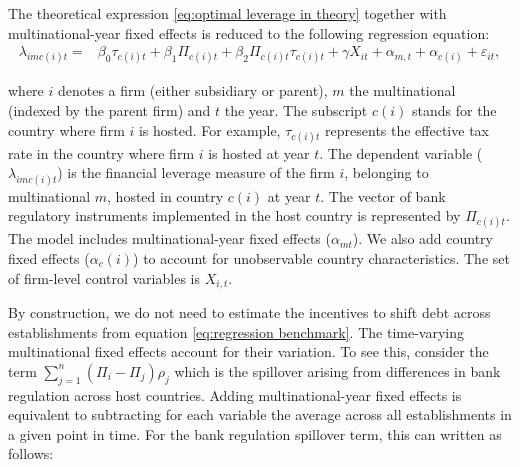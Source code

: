 \documentclass[12pt]{article}
\begin{document}
    The theoretical expression \ref{eq:optimal leverage in theory} together with multinational-year fixed effects is reduced to the following regression equation:
    \begin{equation}
    \begin{aligned}
    \lambda_{imc(i)t}=&\beta_0\tau_{c(i)t}+\beta_1\Pi_{c(i)t}+\beta_2\Pi_{c(i)t}\tau_{c(i)t}+\gamma X_{it}+\alpha_{m,t}+\alpha_{c(i)}+\varepsilon_{it},
    \label{eq:regression benchmark}
    \end{aligned}
    \end{equation}

    where $i$ denotes a firm (either subsidiary or parent), $m$ the multinational (indexed by the parent firm) and $t$ the year. The subscript $c(i)$ stands for the country where firm $i$ is hosted. For example, $\tau_{c(i)t}$ represents the effective tax rate in the country where firm $i$ is hosted at year $t$. The dependent variable ($\lambda_{imc(i)t}$) is the financial leverage measure of the firm $i$, belonging to multinational $m$, hosted in country $c(i)$ at year $t$. The vector of bank regulatory instruments implemented in the host country is represented by $\Pi_{c(i)t}$. The model includes multinational-year fixed effects ($\alpha_{mt}$). We also add country fixed effects ($\alpha_c(i)$) to account for unobservable country characteristics. The set of firm-level control variables is $X_{i,t}$.

    By construction, we do not need to estimate the incentives to shift debt across establishments from equation \ref{eq:regression benchmark}. The time-varying multinational fixed effects account for their variation. To see this, consider the term $\sum_{j=1}^{n}(\Pi_i-\Pi_j)\rho_j$ which is the spillover arising from differences in bank regulation across host countries. Adding multinational-year fixed effects is equivalent to subtracting for each variable the average across all establishments in a given point in time. For the bank regulation spillover term, this can written as follows:
\end{document}
